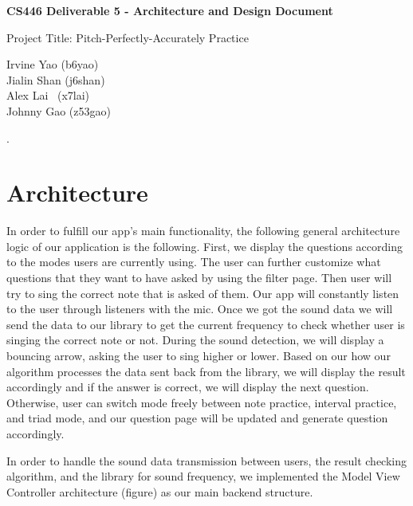 \documentclass{article}
\begin{document}
\begin{titlepage}
   \vspace*{270px}
  \begin{center}

    \Large\textbf{CS446 Deliverable 5 - Architecture and Design Document}

   \vspace{50px}

    \Large{Project Title: Pitch-Perfectly-Accurately Practice}

   \vspace{50px}

    \large{Irvine Yao (b6yao)\\Jialin Shan (j6shan)\\Alex Lai \ (x7lai)\\Johnny Gao (z53gao)}

  \end{center}
\end{titlepage}
  
.


\section{Architecture}
\label{sec:architecture}
\qquad
In order to fulfill our app’s main functionality, the following general architecture logic of our application is the following. First, we display the questions according to the modes users are currently using. The user can further customize what questions that they want to have asked by using the filter page. Then user will try to sing the correct note that is asked of them. Our app will constantly listen to the user through listeners with the mic. Once we got the sound data we will send the data to our library to get the current frequency to check whether user is singing the correct note or not. During the sound detection, we will display a bouncing arrow, asking the user to sing higher or lower. Based on our how our algorithm processes the data sent back from the library, we will display the result accordingly and if the answer is correct, we will display the next question. Otherwise, user can switch mode freely between note practice, interval practice, and triad mode, and our question page will be updated and generate question accordingly. 

In order to handle the sound data transmission between users, the result checking algorithm, and the library for sound frequency, we implemented the Model View Controller architecture (figure) as our main backend structure.
\end{document}
